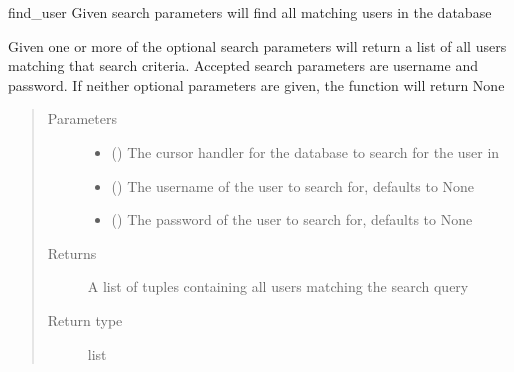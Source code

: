 \documentclass[letterpaper,10pt,english]{sphinxmanual}
\begin{document}
\begin{fulllineitems}
\label{\detokenize{flaskapp.data:flaskapp.data.database.find_user}}
find\_user Given search parameters will find all matching users in the database

Given one or more of the optional search parameters will return a list of all users
matching that search criteria. Accepted search parameters are username and password.
If neither optional parameters are given, the function will return None
\begin{quote}\begin{description}
\item[{Parameters}] \leavevmode\begin{itemize}
\item {} 
 () \textendash{} The cursor handler for the database to search for the user in

\item {} 
 (\sphinxstyleliteralemphasis{\sphinxupquote{, }}) \textendash{} The username of the user to search for, defaults to None

\item {} 
 (\sphinxstyleliteralemphasis{\sphinxupquote{, }}) \textendash{} The password of the user to search for, defaults to None

\end{itemize}

\item[{Returns}] \leavevmode
A list of tuples containing all users matching the search query

\item[{Return type}] \leavevmode
list

\end{description}\end{quote}

\end{fulllineitems}
\end{document}

